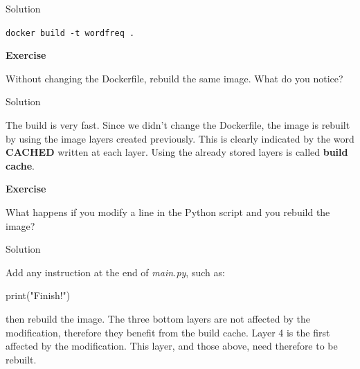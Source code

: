 \documentclass[
]{article}
\newenvironment{Shaded}{\begin{snugshade}}{\end{snugshade}}
\newcommand{\BuiltInTok}[1]{#1}
\newcommand{\NormalTok}[1]{#1}
\newcommand{\StringTok}[1]{\textcolor[rgb]{0.31,0.60,0.02}{#1}}
\newenvironment{infobox}[1]
  {
  \begin{itemize}
  \renewcommand{\labelitemi}{
    \raisebox{-.7\height}[0pt][0pt]{
      
    }
  }
  \setlength{\fboxsep}{1em}
  \begin{whitebox}
  \item
  }
  {
  \end{whitebox}
  \end{itemize}
  }
\theoremstyle{definition}
\theoremstyle{definition}
\theoremstyle{definition}
\theoremstyle{remark}
\let\BeginKnitrBlock\begin \let\EndKnitrBlock\end
\begin{document}
Solution

\begin{infobox}{exercisebox}
\texttt{docker\ build\ -t\ wordfreq\ .}

\end{infobox}

\begin{infobox}{exercisebox}

\textbf{Exercise}

\BeginKnitrBlock{exercise}
\label{exr:unnamed-chunk-21}{\label{exr:unnamed-chunk-21} }Without changing the Dockerfile, rebuild the same image.
What do you notice?
\EndKnitrBlock{exercise}

\end{infobox}

Solution

\begin{infobox}{exercisebox}
The build is very fast.
Since we didn't change the Dockerfile, the image
is rebuilt by using the image layers created
previously.
This is clearly indicated by the word \textbf{CACHED} written
at each layer.
Using the already stored layers is called \textbf{build cache}.

\end{infobox}

\begin{infobox}{exercisebox}

\textbf{Exercise}

\BeginKnitrBlock{exercise}
\label{exr:unnamed-chunk-22}{\label{exr:unnamed-chunk-22} }What happens if you modify a line in the Python script and
you rebuild the image?
\EndKnitrBlock{exercise}

\end{infobox}

Solution

\begin{infobox}{exercisebox}
Add any instruction at the end of \emph{main.py}, such as:

\begin{Shaded}
\begin{Highlighting}[]
\BuiltInTok{print}\NormalTok{(}\StringTok{"Finish!"}\NormalTok{)}
\end{Highlighting}
\end{Shaded}

then rebuild the image.
The three bottom layers are not affected by the modification, therefore
they benefit from the build cache.
Layer 4 is the first affected by the modification.
This layer, and those above, need therefore to be
rebuilt.

\end{infobox}
\end{document}
